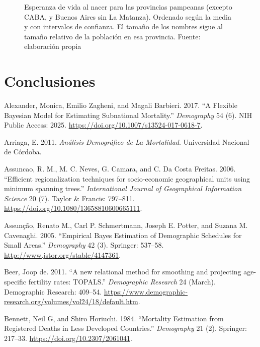 \documentclass[12pt,]{article}
\begin{document}
\begin{figure}
{}

\caption{Esperanza de vida al nacer para las provincias pampeanas (excepto CABA, y Buenos Aires sin La Matanza). Ordenado según la media y con intervalos de confianza. El tamaño de los nombres sigue al tamaño relativo de la población en esa provincia. Fuente: elaboración propia}\label{fig:jerarq}
\end{figure}

\hypertarget{conclusiones}{%
\section*{\texorpdfstring{\textbf{Conclusiones}}{Conclusiones}}\label{conclusiones}}

\hypertarget{refs}{}
\leavevmode\hypertarget{ref-Alexander2017}{}%
Alexander, Monica, Emilio Zagheni, and Magali Barbieri. 2017. ``A
Flexible Bayesian Model for Estimating Subnational Mortality.''
\emph{Demography} 54 (6). NIH Public Access: 2025.
\url{https://doi.org/10.1007/s13524-017-0618-7}.

\leavevmode\hypertarget{ref-Arriaga2011}{}%
Arriaga, E. 2011. \emph{Análisis Demográfico de La Mortalidad}.
Universidad Nacional de Córdoba.

\leavevmode\hypertarget{ref-AssunCao2006}{}%
Assuncao, R. M., M. C. Neves, G. Camara, and C. Da Costa Freitas. 2006.
``Efficient regionalization techniques for socio-economic geographical
units using minimum spanning trees.'' \emph{International Journal of
Geographical Information Science} 20 (7). Taylor \& Francis: 797--811.
\url{https://doi.org/10.1080/13658810600665111}.

\leavevmode\hypertarget{ref-Assuncao2005}{}%
Assunção, Renato M., Carl P. Schmertmann, Joseph E. Potter, and Suzana
M. Cavenaghi. 2005. ``Empirical Bayes Estimation of Demographic
Schedules for Small Areas.'' \emph{Demography} 42 (3). Springer:
537--58. \url{http://www.jstor.org/stable/4147361}.

\leavevmode\hypertarget{ref-deBeer2011}{}%
Beer, Joop de. 2011. ``A new relational method for smoothing and
projecting age-specific fertility rates: TOPALS.'' \emph{Demographic
Research} 24 (March). Demographic Research: 409--54.
\url{https://www.demographic-research.org/volumes/vol24/18/default.htm}.

\leavevmode\hypertarget{ref-Bennett_Horiuchi_1984}{}%
Bennett, Neil G, and Shiro Horiuchi. 1984. ``Mortality Estimation from
Registered Deaths in Less Developed Countries.'' \emph{Demography} 21
(2). Springer: 217--33. \url{https://doi.org/10.2307/2061041}.
\end{document}
